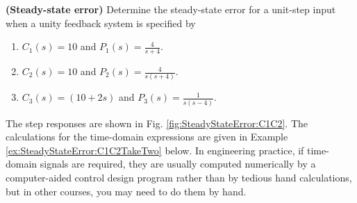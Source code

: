 \begin{example}{\bf (Steady-state error)}
\label{ex:SteadyStateError:C1C2}
Determine the steady-state error for a unit-step input when a unity feedback system is specified by 
 \begin{enumerate}
\renewcommand{\labelenumi}{(\alph{enumi})}
\setlength{\itemsep}{.2cm}
\item $C_1(s) = 10$ and $P_1(s) = \frac{4}{s+4}$.

\item $C_2(s)= 10$ and $P_2(s) = \frac{4}{s(s+4)}$.

\item $C_3(s)= (10 + 2s)$ and $P_3(s) = \frac{1}{s(s-4)}$.
\end{enumerate}
\end{example}
\solution The step responses are shown in Fig. \ref{fig:SteadyStateError:C1C2}. The calculations for the time-domain expressions are given in Example \ref{ex:SteadyStateError:C1C2TakeTwo} below. In engineering practice, if time-domain signals are required, they are usually computed numerically by a computer-aided control design program rather than by tedious hand calculations, but in other courses, you may need to do them by hand. \\


